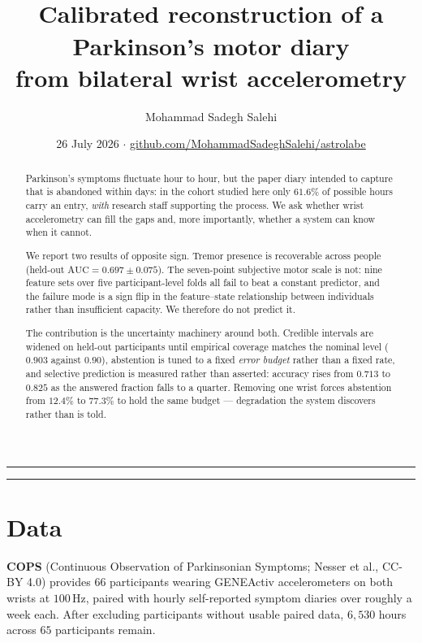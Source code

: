 \documentclass[11pt,a4paper]{article}
\title{\vspace{-1.3cm}\textcolor{ink}{\textbf{\astro}}\\[0.25em]
\large\textcolor{ink}{Calibrated reconstruction of a Parkinson's motor diary}\\
\large\textcolor{ink}{from bilateral wrist accelerometry}\vspace{-0.2em}}
\author{\normalsize\textcolor{ink2}{Mohammad Sadegh Salehi}}
\date{\normalsize\textcolor{ink2}{26 July 2026 \quad$\cdot$\quad
\href{https://github.com/MohammadSadeghSalehi/astrolabe}{github.com/MohammadSadeghSalehi/astrolabe}}}
\begin{document}
\maketitle
\thispagestyle{empty}

\noindent\textcolor{axis}{\rule{\textwidth}{0.6pt}}

\begin{abstract}
\noindent\color{ink2}
Parkinson's symptoms fluctuate hour to hour, but the paper diary intended to
capture that is abandoned within days: in the cohort studied here only
$61.6\%$ of possible hours carry an entry, \emph{with} research staff
supporting the process. We ask whether wrist accelerometry can fill the gaps
and, more importantly, whether a system can know when it cannot.

We report two results of opposite sign. Tremor presence is recoverable across
people (held-out $\mathrm{AUC}=0.697\pm0.075$). The seven-point subjective
motor scale is not: nine feature sets over five participant-level folds all
fail to beat a constant predictor, and the failure mode is a sign flip in the
feature--state relationship between individuals rather than insufficient
capacity. We therefore do not predict it.

The contribution is the uncertainty machinery around both. Credible intervals
are widened on held-out participants until empirical coverage matches the
nominal level ($0.903$ against $0.90$), abstention is tuned to a fixed
\emph{error budget} rather than a fixed rate, and selective prediction is
measured rather than asserted: accuracy rises from $0.713$ to $0.825$ as the
answered fraction falls to a quarter. Removing one wrist forces abstention from
$12.4\%$ to $77.3\%$ to hold the same budget --- degradation the system
discovers rather than is told.
\end{abstract}

\noindent\textcolor{axis}{\rule{\textwidth}{0.6pt}}
\vspace{0.3em}

\section{Data}

\textbf{COPS} (Continuous Observation of Parkinsonian Symptoms; Nesser et al.,
CC-BY 4.0) provides 66 participants wearing GENEActiv accelerometers on both
wrists at $100\,\mathrm{Hz}$, paired with hourly self-reported symptom diaries
over roughly a week each. After excluding participants without usable paired
data, $6{,}530$ hours across $65$ participants remain.
\end{document}
